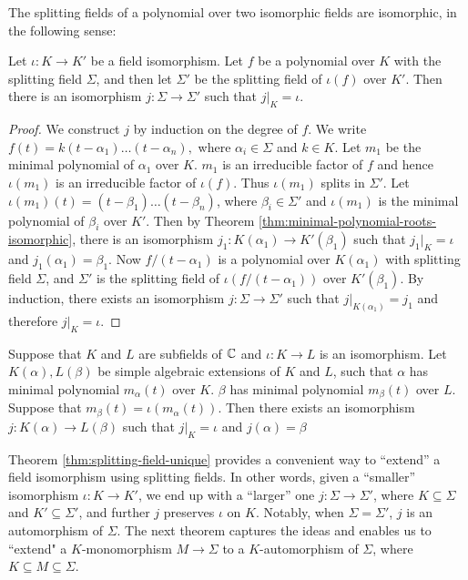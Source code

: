 The splitting fields of a polynomial over two isomorphic fields are isomorphic, in the following sense:

\begin{theorem} \label{thm:splitting-field-unique}
	Let $\iota: K \to K'$ be a field isomorphism. Let $f$ be a polynomial over $K$ with the splitting field $\Sigma$, and then let $\Sigma'$ be the splitting field of $\iota(f)$ over $K'$. Then there is an isomorphism $j : \Sigma \to \Sigma'$ such that $j | _K = \iota$. 
\end{theorem}

\begin{proof}
	We construct $j$ by induction on the degree of $f$. We write $ f(t) = k (t - \alpha_1) \ldots (t - \alpha_n), $ where $\alpha_i \in \Sigma$ and $k \in K$. Let $m_1$ be the minimal polynomial of $\alpha_1$ over $K$. $m_1$ is an irreducible factor of $f$ and hence $\iota(m_1)$ is an irreducible factor of $\iota(f)$. Thus $\iota(m_1)$ splits in $\Sigma'$. Let $\iota(m_1)(t) = (t - \beta_1) \ldots (t - \beta_n)$, where $\beta_i \in \Sigma'$ and $\iota(m_1)$ is the minimal polynomial of $\beta_i$ over $K'$. Then by Theorem \ref{thm:minimal-polynomial-roots-isomorphic}, there is an isomorphism $j_1 : K(\alpha_1) \to K'(\beta_1)$ such that $j_1 | _K = \iota$ and $j_1(\alpha_1) = \beta_1$. Now $f / (t - \alpha_1)$ is a polynomial over $K(\alpha_1)$ with splitting field $\Sigma$, and $\Sigma'$ is the splitting field of $\iota(f / (t - \alpha_1))$ over $K'(\beta_1)$. By induction, there exists an isomorphism $j: \Sigma \to \Sigma'$ such that $j | _{K(\alpha_1)} = j_1$ and therefore $j | _K = \iota$. 
\end{proof}

\begin{theorem}
    Suppose that $K$ and $L$ are subfields of $\mathbb C$ and $\iota : K \to L$ is an isomorphism. Let $K(\alpha),L(\beta)$ be simple algebraic extensions of $K$ and $L$, such that $\alpha$ has minimal polynomial $m_{\alpha}(t)$ over $K$. $\beta$ has minimal polynomial $m_{\beta}(t)$ over $L$. Suppose that $m_{\beta}(t) = \iota(m_{\alpha}(t))$. Then there exists an isomorphism $j : K(\alpha) \to L(\beta)$ such that $j|_{K} = \iota$ and $j(\alpha) = \beta$
\end{theorem}

Theorem \ref{thm:splitting-field-unique} provides a convenient way to ``extend'' a field isomorphism using splitting fields. In other words, given a ``smaller'' isomorphism $\iota: K \to K'$, we end up with a ``larger'' one $j: \Sigma \to \Sigma'$, where $K \subseteq \Sigma$ and $K' \subseteq \Sigma'$, and further $j$ preserves $\iota$ on $K$. Notably, when $\Sigma  = \Sigma'$, $j$ is an automorphism of $\Sigma$. The next theorem captures the ideas and enables us to ``extend" a $K$-monomorphism $M \to \Sigma$ to a $K$-automorphism of $\Sigma$, where $K \subseteq M \subseteq \Sigma$. 

